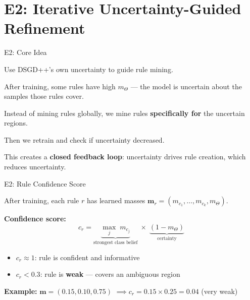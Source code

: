 \documentclass[aspectratio=169,12pt]{beamer}
\begin{document}
\section{E2: Iterative Uncertainty-Guided Refinement}

\begin{frame}{E2: Core Idea}

\begin{center}
\Large
\textcolor{dstblue}{Use DSGD++'s own uncertainty to guide rule mining.}
\end{center}

\vspace{1.5em}
After training, some rules have high $m_\Theta$ --- the model is
uncertain about the samples those rules cover.

\vspace{1em}
Instead of mining rules globally, we mine rules \textbf{specifically for}
the uncertain regions.

\vspace{1em}
Then we retrain and check if uncertainty decreased.

\vspace{1em}
This creates a \textbf{closed feedback loop}: uncertainty drives rule creation,
which reduces uncertainty.

\end{frame}

\begin{frame}{E2: Rule Confidence Score}

After training, each rule $r$ has learned masses
$\mathbf{m}_r = (m_{c_1}, \ldots, m_{c_k}, m_\Theta)$.

\vspace{1.5em}
\textbf{Confidence score:}
$$c_r = \underbrace{\max_{j}\; m_{c_j}}_{\text{strongest class belief}}
      \;\times\;
      \underbrace{(1 - m_\Theta)}_{\text{certainty}}$$

\vspace{1.5em}
\begin{itemize}
    \item $c_r \approx 1$: rule is confident and informative
    \item $c_r < 0.3$: rule is \textbf{weak} --- covers an ambiguous region
\end{itemize}

\vspace{1em}
\textbf{Example:} $\mathbf{m} = (0.15, 0.10, 0.75)$
$\implies c_r = 0.15 \times 0.25 = 0.04$ \quad (very weak)

\end{frame}
\end{document}

